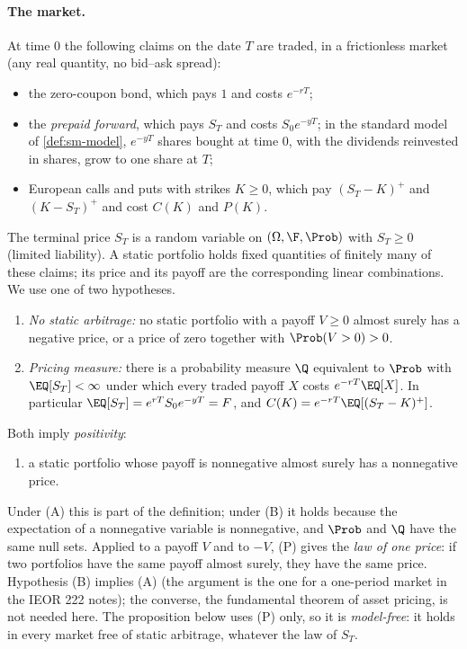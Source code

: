 \paragraph{The market.} At time $0$ the following claims on the date $T$ are traded, in a
frictionless market (any real quantity, no bid--ask spread):
\begin{itemize}
  \item the zero-coupon bond, which pays $1$ and costs $e^{-rT}$;
  \item the \emph{prepaid forward}, which pays $S_T$ and costs $S_0e^{-yT}$; in the standard model
    of \cref{def:sm-model}, $e^{-yT}$ shares bought at time $0$, with the dividends reinvested in
    shares, grow to one share at $T$;
  \item European calls and puts with strikes $K\ge0$, which pay $(S_T-K)^+$ and $(K-S_T)^+$ and
    cost $C(K)$ and $P(K)$.
\end{itemize}
The terminal price $S_T$ is a random variable on $(\Omega,\F,\Prob)$ with $S_T\ge0$ (limited
liability). A static portfolio holds fixed quantities of finitely many of these claims; its
price and its payoff are the corresponding linear combinations. We use one of two hypotheses.
\begin{enumerate}[label=(\Alph*)]
  \item \emph{No static arbitrage:} no static portfolio with a payoff $V\ge0$ almost surely has
    a negative price, or a price of zero together with $\Prob(V>0)>0$.
  \item \emph{Pricing measure:} there is a probability measure $\Q$ equivalent to $\Prob$ with
    $\EQ[S_T]<\infty$ under which every traded payoff $X$ costs $e^{-rT}\EQ[X]$. In particular
    $\EQ[S_T]=e^{rT}S_0e^{-yT}=F$, and $C(K)=e^{-rT}\EQ[(S_T-K)^+]$.
\end{enumerate}
Both imply \emph{positivity}:
\begin{enumerate}[label=(P)]
  \item a static portfolio whose payoff is nonnegative almost surely has a nonnegative price.
\end{enumerate}
Under (A) this is part of the definition; under (B) it holds because the expectation of a
nonnegative variable is nonnegative, and $\Prob$ and $\Q$ have the same null sets. Applied to a
payoff $V$ and to $-V$, (P) gives the \emph{law of one price}: if two portfolios have the same
payoff almost surely, they have the same price. Hypothesis (B) implies (A) (the argument is
the one for a one-period market in the IEOR 222 notes); the converse, the fundamental theorem of
asset pricing, is not needed here. The proposition below uses (P) only, so it is
\emph{model-free}: it holds in every market free of static arbitrage, whatever the law of $S_T$.


